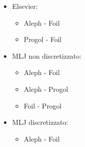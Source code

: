 \begin{itemize}
	\item Elsevier:
		\begin{itemize}
			\item Aleph - Foil
			\item Progol - Foil
		\end{itemize}
	\item MLJ non discretizzato:
		\begin{itemize}
			\item Aleph - Foil
			\item Aleph - Progol
			\item Foil - Progol
		\end{itemize}
	\item MLJ discretizzato:
		\begin{itemize}
			\item Aleph - Foil
		\end{itemize}
\end{itemize}

